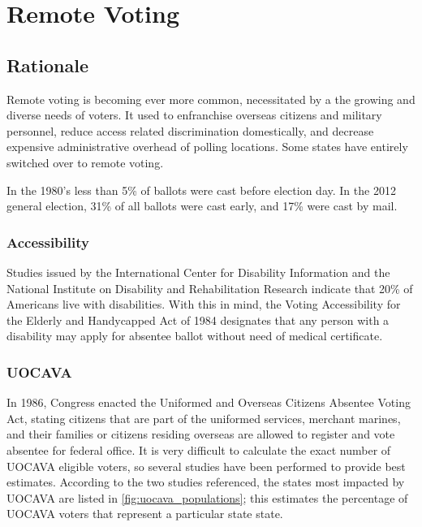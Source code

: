 \chapter{Remote Voting}
\label{chapter:remote_voting}

\section{Rationale}
Remote voting is becoming ever more common, necessitated by a the growing and diverse needs of voters. It used to enfranchise overseas citizens and military personnel, reduce access related discrimination domestically, and decrease expensive administrative overhead of polling locations. Some states have entirely switched over to remote voting. 

In the 1980's less than 5\% of ballots were cast before election day. In the 2012 general election, 31\% of all ballots were cast early, and 17\% were cast by mail.

\subsection{Accessibility}
Studies issued by the International Center for Disability Information and the National Institute on Disability and Rehabilitation Research indicate that 20\% of Americans live with disabilities. With this in mind, the Voting Accessibility for the Elderly and Handycapped Act of 1984 designates that any person with a disability may apply for absentee ballot without need of medical certificate.


\subsection{UOCAVA}
In 1986, Congress enacted the Uniformed and Overseas Citizens Absentee Voting Act, stating citizens that are part of the uniformed services, merchant marines, and their families or citizens residing overseas are allowed to register and vote absentee for federal office. It is very difficult to calculate the exact number of UOCAVA eligible voters, so several studies have been performed to provide best estimates. According to the two studies referenced, the states most impacted by UOCAVA are listed in \autoref{fig:uocava_populations}; this estimates the percentage of UOCAVA voters that represent a particular state state.

